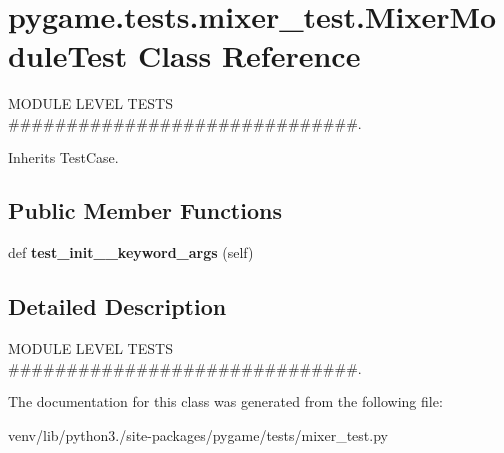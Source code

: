 \hypertarget{classpygame_1_1tests_1_1mixer__test_1_1_mixer_module_test}{}\section{pygame.\+tests.\+mixer\+\_\+test.\+Mixer\+Module\+Test Class Reference}
\label{classpygame_1_1tests_1_1mixer__test_1_1_mixer_module_test}


M\+O\+D\+U\+LE L\+E\+V\+EL T\+E\+S\+TS \#\#\#\#\#\#\#\#\#\#\#\#\#\#\#\#\#\#\#\#\#\#\#\#\#\#\#\#\#\#.  




Inherits Test\+Case.

\subsection*{Public Member Functions}
\begin{DoxyCompactItemize}
\item 
\mbox{\label{classpygame_1_1tests_1_1mixer__test_1_1_mixer_module_test_adc99e3d29e626736373a240f45b07d91}} 
def {\bfseries test\+\_\+init\+\_\+\+\_\+keyword\+\_\+args} (self)
\end{DoxyCompactItemize}


\subsection{Detailed Description}
M\+O\+D\+U\+LE L\+E\+V\+EL T\+E\+S\+TS \#\#\#\#\#\#\#\#\#\#\#\#\#\#\#\#\#\#\#\#\#\#\#\#\#\#\#\#\#\#. 

The documentation for this class was generated from the following file\+:\begin{DoxyCompactItemize}
\item 
venv/lib/python3./site-\/packages/pygame/tests/mixer\+\_\+test.\+py\end{DoxyCompactItemize}
